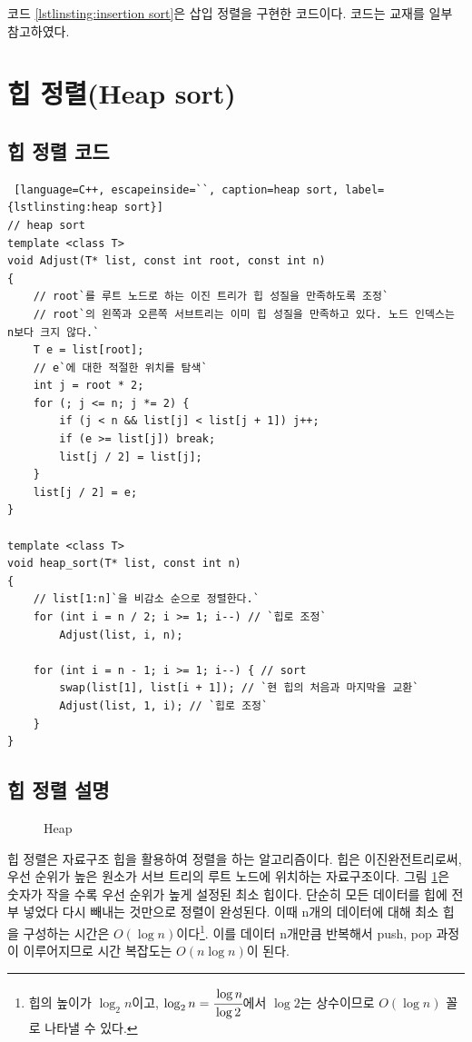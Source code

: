 \documentclass{article}
\begin{document}
코드 \ref{lstlinsting:insertion sort}은 삽입 정렬을 구현한 코드이다. 코드는 교재를 일부 참고하였다.

\section{힙 정렬(Heap sort)}
\subsection{힙 정렬 코드}
\begin{lstlisting} [language=C++, escapeinside=``, caption=heap sort, label={lstlinsting:heap sort}]
// heap sort
template <class T>
void Adjust(T* list, const int root, const int n)
{
	// root`를 루트 노드로 하는 이진 트리가 힙 성질을 만족하도록 조정`
	// root`의 왼쪽과 오른쪽 서브트리는 이미 힙 성질을 만족하고 있다. 노드 인덱스는 n보다 크지 않다.`
	T e = list[root];
	// e`에 대한 적절한 위치를 탐색`
	int j = root * 2;
	for (; j <= n; j *= 2) {
		if (j < n && list[j] < list[j + 1]) j++;
		if (e >= list[j]) break;
		list[j / 2] = list[j];
	}
	list[j / 2] = e;
}

template <class T>
void heap_sort(T* list, const int n)
{
	// list[1:n]`을 비감소 순으로 정렬한다.`
	for (int i = n / 2; i >= 1; i--) // `힙로 조정`
		Adjust(list, i, n);
	
	for (int i = n - 1; i >= 1; i--) { // sort
		swap(list[1], list[i + 1]); // `현 힙의 처음과 마지막을 교환`
		Adjust(list, 1, i); // `힙로 조정`
	}
}
\end{lstlisting}
\subsection{힙 정렬 설명}
\begin{figure}
    \centering
    \caption{Heap}
    \label{fig:heap structure}
\end{figure}

힙 정렬은 자료구조 힙을 활용하여 정렬을 하는 알고리즘이다. 힙은 이진완전트리로써, 우선 순위가 높은 원소가 서브 트리의 루트 노드에 위치하는 자료구조이다. 그림 \ref{fig:heap structure}은 숫자가 작을 수록 우선 순위가 높게 설정된 최소 힙이다. 단순히 모든 데이터를 힙에 전부 넣었다 다시 빼내는 것만으로 정렬이 완성된다. 이때 n개의 데이터에 대해 최소 힙을 구성하는 시간은 $O(\log{n})$이다\footnote{힙의 높이가 $\log_2{n}$이고, $\log_2{n}=\cfrac{\log{n}}{\log{2}}$에서 $\log{2}$는 상수이므로 $O(\log{n})$ 꼴로 나타낼 수 있다.}. 이를 데이터 n개만큼 반복해서 push, pop 과정이 이루어지므로 시간 복잡도는 $O(n\log{n})$이 된다.
\end{document}
